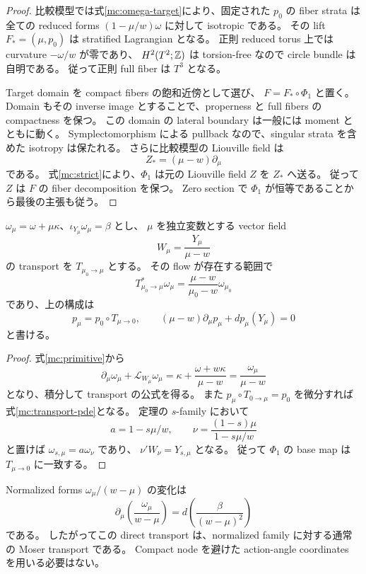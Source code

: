\begin{proof}
比較模型では式\eqref{mc:omega-target}により、固定された $p_0$ の fiber strata は
全ての reduced forms $(1-\mu/w)\omega$ に対して isotropic である。
その lift $F_*=(\mu,p_0)$ は stratified Lagrangian となる。
正則 reduced torus 上では curvature $-\omega/w$ が零であり、
$H^2(T^2;\mathbb Z)$ は torsion-free なので circle bundle は自明である。
従って正則 full fiber は $T^3$ となる。

Target domain を compact fibers の飽和近傍として選び、
$F=F_*\circ\Phi_1$ と置く。
Domain もその inverse image とすることで、properness と full fibers の compactness を保つ。
この domain の lateral boundary は一般には moment とともに動く。
Symplectomorphism による pullback なので、singular strata を含めた isotropy は保たれる。
さらに比較模型の Liouville field は
\[
 Z_*=(\mu-w)\partial_\mu
\]
である。
式\eqref{mc:strict}により、$\Phi_1$ は元の Liouville field $Z$ を $Z_*$ へ送る。
従って $Z$ は $F$ の fiber decomposition を保つ。
Zero section で $\Phi_1$ が恒等であることから最後の主張も従う。
\end{proof}

\begin{proposition}
\label{mc:direct-transport}
$\omega_\mu=\omega+\mu\kappa$、$\iota_{Y_\mu}\omega_\mu=\beta$ とし、
$\mu$ を独立変数とする vector field
\[
 W_\mu=\frac{Y_\mu}{\mu-w}
\]
の transport を $T_{\mu_0\to\mu}$ とする。
その flow が存在する範囲で
\[
 T_{\mu_0\to\mu}^*\omega_\mu
 =\frac{\mu-w}{\mu_0-w}\omega_{\mu_0}
\]
であり、上の構成は
\begin{equation}
 p_\mu=p_0\circ T_{\mu\to0},
 \qquad
 (\mu-w)\partial_\mu p_\mu+dp_\mu(Y_\mu)=0
 \label{mc:transport-pde}
\end{equation}
と書ける。
\end{proposition}

\begin{proof}
式\eqref{mc:primitive}から
\[
 \partial_\mu\omega_\mu+\mathcal L_{W_\mu}\omega_\mu
 =\kappa+\frac{\omega+w\kappa}{\mu-w}
 =\frac{\omega_\mu}{\mu-w}
\]
となり、積分して transport の公式を得る。
また $p_\mu\circ T_{0\to\mu}=p_0$ を微分すれば式\eqref{mc:transport-pde}となる。
定理の $s$-family において
\[
 a=1-s\mu/w,
 \qquad \nu=\frac{(1-s)\mu}{1-s\mu/w}
\]
と置けば $\omega_{s,\mu}=a\omega_\nu$ であり、
$\nu'W_\nu=Y_{s,\mu}$ となる。
従って $\Phi_1$ の base map は $T_{\mu\to0}$ に一致する。
\end{proof}

Normalized forms $\omega_\mu/(w-\mu)$ の変化は
\[
 \partial_\mu\left(\frac{\omega_\mu}{w-\mu}\right)
 =d\left(\frac{\beta}{(w-\mu)^2}\right)
\]
である。
したがってこの direct transport は、normalized family に対する通常の Moser transport である。
Compact node を避けた action-angle coordinates を用いる必要はない。

